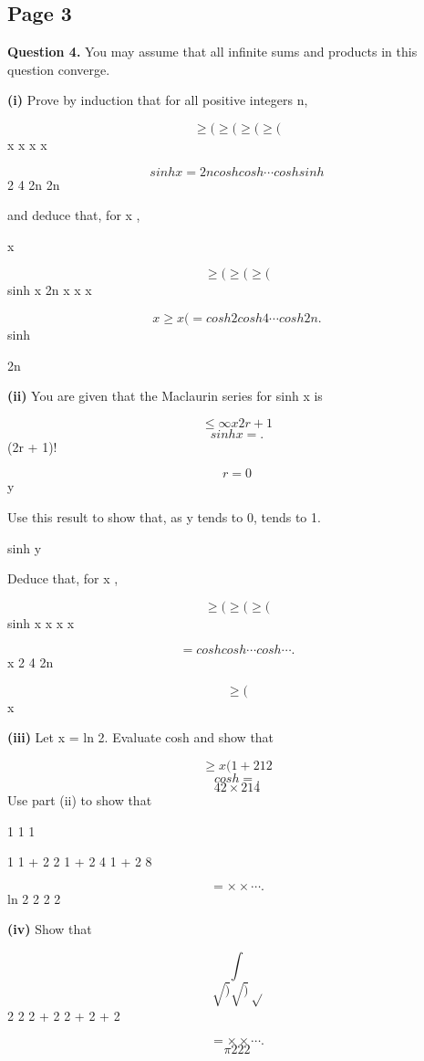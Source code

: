\documentclass[12pt]{article}
\begin{document}
\subsection*{Page 3}
\begin{flushleft}
\bigskip\textbf{Question 4.} You may assume that all infinite sums and products in this question converge.\par
\textbf{(i)} Prove by induction that for all positive integers n,\par
\[\geq ( \geq ( \geq ( \geq (\]
x x x x\par
\[sinh x = 2 n cosh cosh \cdots cosh sinh\]
2 4 2n 2n\par
and deduce that, for x ,\par
x\par
\[\geq ( \geq ( \geq (\]
sinh x 2n x x x\par
\[x \geq x ( = cosh 2 cosh 4 \cdots cosh 2n .\]
sinh\par
2n\par
\textbf{(ii)} You are given that the Maclaurin series for sinh x is\par
\[\leq\infty x2r+1\]
\[sinh x = .\]
(2r + 1)!\par
\[r=0\]
y\par
Use this result to show that, as y tends to 0, tends to 1.\par
sinh y\par
Deduce that, for x ,\par
\[\geq ( \geq ( \geq (\]
sinh x x x x\par
\[= cosh cosh \cdots cosh \cdots .\]
x 2 4 2n\par
\[\geq (\]
x\par
\textbf{(iii)} Let x = ln 2. Evaluate cosh and show that\par
\[\geq x ( 1 + 2 1 2\]
\[cosh = .\]
\[4 2 \times 2 1 4\]
Use part (ii) to show that\par
1 1 1\par
1 1 + 2 2 1 + 2 4 1 + 2 8\par
\[= \times \times \cdots .\]
ln 2 2 2 2\par
\textbf{(iv)} Show that\par
\[\int\]
\[\sqrt ) \sqrt ) \sqrt\]
2 2 2 + 2 2 + 2 + 2\par
\[= \times \times \cdots .\]
\[\pi 2 2 2\]
\end{flushleft}
\end{document}
